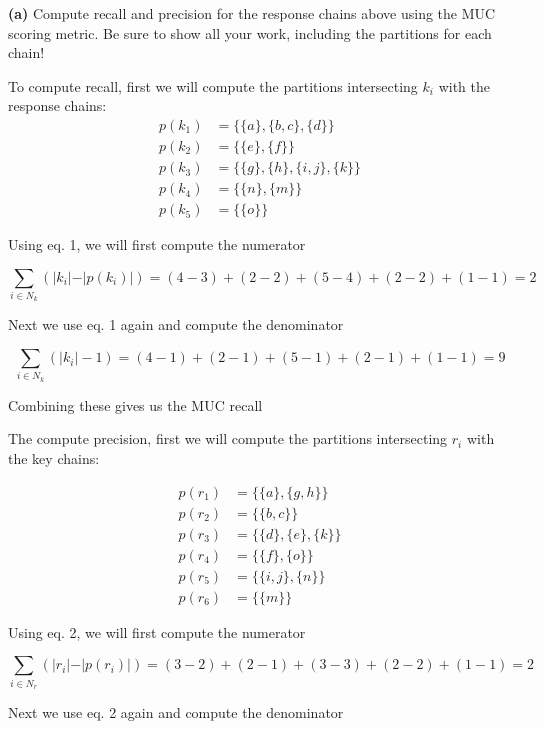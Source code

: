 \documentclass[11pt]{article}
\renewcommand\part[1]{\vspace{.10in}\textbf{(#1)}}
\begin{document}
\part{a} Compute recall and precision for the response chains above using the MUC scoring metric. Be sure to show all your work, including the partitions for each chain!

To compute recall, first we will compute the partitions intersecting $k_i$ with the response chains:
\begin{align*}
p(k_1) &= \{\{a\},\{b, c\},\{d\}\} \\
p(k_2) &= \{\{e\},\{f\}\} \\
p(k_3) &= \{\{g\},\{h\},\{i, j\},\{k\}\} \\
p(k_4) &= \{\{n\},\{m\}\} \\
p(k_5) &= \{\{o\}\}
\end{align*}

Using eq. 1, we will first compute the numerator

$$\sum_{i \in N_k} ( \vert k_i \vert - \vert p(k_i) \vert ) = (4 - 3) + (2 - 2) + (5 - 4) + (2 - 2) + (1 - 1) = 2$$

Next we use eq. 1 again and compute the denominator

$$\sum_{i \in N_k} ( \vert k_i \vert - 1) = (4 - 1) + (2 - 1) + (5 - 1) + (2 - 1) + (1 - 1) = 9$$

Combining these gives us the MUC recall 

\newline 

The compute precision, first we will compute the partitions intersecting $r_i$ with the key chains:

\begin{align*}
p(r_1) &= \{\{a\},\{g, h\}\} \\
p(r_2) &= \{\{b, c\}\} \\
p(r_3) &= \{\{d\},\{e\},\{k\}\} \\
p(r_4) &= \{\{f\},\{o\}\} \\
p(r_5) &= \{\{i, j\}, \{n\}\} \\
p(r_6) &= \{\{m\}\}
\end{align*}

Using eq. 2, we will first compute the numerator

$$\sum_{i \in N_r} ( \vert r_i \vert - \vert p(r_i) \vert ) = (3 - 2) + (2 - 1) + (3 - 3) + (2 - 2) + (1 - 1) = 2$$

Next we use eq. 2 again and compute the denominator
\end{document}
